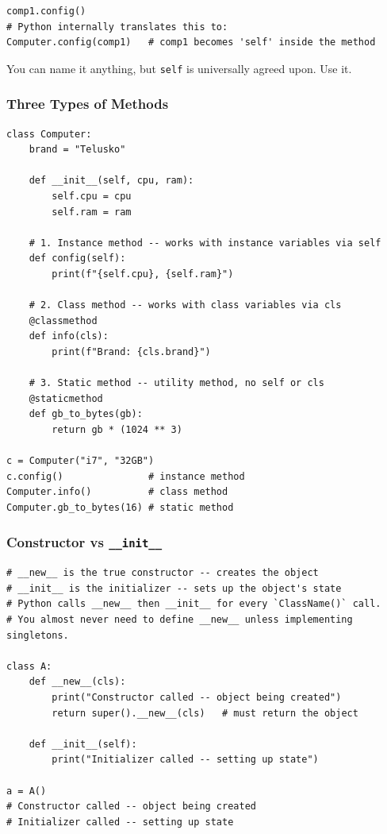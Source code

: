 \documentclass[12pt,a4paper]{article}
\newcommand{\code}[1]{\texttt{\small\color{pyblue}#1}}
\begin{document}
\begin{lstlisting}
comp1.config()
# Python internally translates this to:
Computer.config(comp1)   # comp1 becomes 'self' inside the method
\end{lstlisting}

You can name it anything, but \code{self} is universally agreed upon. Use it.

\subsubsection{Three Types of Methods}

\begin{lstlisting}
class Computer:
    brand = "Telusko"

    def __init__(self, cpu, ram):
        self.cpu = cpu
        self.ram = ram

    # 1. Instance method -- works with instance variables via self
    def config(self):
        print(f"{self.cpu}, {self.ram}")

    # 2. Class method -- works with class variables via cls
    @classmethod
    def info(cls):
        print(f"Brand: {cls.brand}")

    # 3. Static method -- utility method, no self or cls
    @staticmethod
    def gb_to_bytes(gb):
        return gb * (1024 ** 3)

c = Computer("i7", "32GB")
c.config()               # instance method
Computer.info()          # class method
Computer.gb_to_bytes(16) # static method
\end{lstlisting}

\subsubsection{Constructor vs \texttt{\_\_init\_\_}}

\begin{lstlisting}
# __new__ is the true constructor -- creates the object
# __init__ is the initializer -- sets up the object's state
# Python calls __new__ then __init__ for every `ClassName()` call.
# You almost never need to define __new__ unless implementing singletons.

class A:
    def __new__(cls):
        print("Constructor called -- object being created")
        return super().__new__(cls)   # must return the object

    def __init__(self):
        print("Initializer called -- setting up state")

a = A()
# Constructor called -- object being created
# Initializer called -- setting up state
\end{lstlisting}
\end{document}
